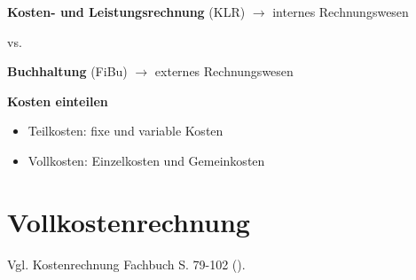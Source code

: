 \textbf{Kosten- und Leistungsrechnung} (KLR) $\to$ internes
Rechnungswesen

vs.

\textbf{Buchhaltung} (FiBu) $\to$ externes Rechnungswesen

\textbf{Kosten einteilen}

\begin{itemize}
\item
  Teilkosten: fixe und variable Kosten
\item
  Vollkosten: Einzelkosten und Gemeinkosten
\end{itemize}

\section{Vollkostenrechnung}\label{vollkostenrechnung}

Vgl. Kostenrechnung Fachbuch S. 79-102
(\textcite{heiser:2017:betriebsfuhrung}).

